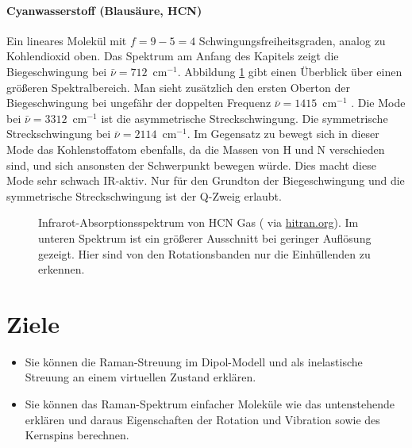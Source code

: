\paragraph{Cyanwasserstoff (Blausäure, HCN)}  
\begin{marginfigure}
\end{marginfigure}
Ein lineares Molekül mit $f=9 - 5 = 4$ Schwingungsfreiheitsgraden, analog zu Kohlendioxid oben. Das Spektrum am Anfang des Kapitels zeigt die Biegeschwingung bei $\bar{\nu} = 712$~cm$^{-1}$.  Abbildung \ref{fig:vib_hcn_all} gibt einen Überblick über einen größeren Spektralbereich. Man sieht zusätzlich den 
ersten Oberton der Biegeschwingung bei ungefähr der doppelten Frequenz  $\bar{\nu} = 1415$~cm$^{-1}$
. Die Mode bei  $\bar{\nu} = 3312$~cm$^{-1}$ ist die  asymmetrische Streckschwingung. Die symmetrische Streckschwingung  bei $\bar{\nu} = 2114$~cm$^{-1}$.
 Im Gegensatz zu  bewegt sich in dieser Mode das Kohlenstoffatom ebenfalls, da die Massen von H und N verschieden sind, und sich ansonsten der  Schwerpunkt bewegen würde. Dies macht diese Mode sehr schwach IR-aktiv.  Nur für den Grundton der Biegeschwingung und die  symmetrische Streckschwingung ist der Q-Zweig erlaubt.

\begin{figure}
\caption{Infrarot-Absorptionsspektrum von HCN Gas  (\cite{Maki_1995_HCN} via \href{https://hitran.org}{hitran.org}). Im unteren Spektrum ist ein größerer Ausschnitt bei geringer Auflösung gezeigt. Hier sind von den Rotationsbanden nur die Einhüllenden zu erkennen.
\label{fig:vib_hcn_all}}
\end{figure}






\section{Ziele}

\begin{itemize}
\item Sie können die Raman-Streuung im Dipol-Modell und als inelastische Streuung an einem virtuellen Zustand erklären.

\item Sie können das Raman-Spektrum einfacher Moleküle wie das untenstehende erklären und daraus Eigenschaften der Rotation und Vibration sowie des Kernspins berechnen.

\end{itemize}

